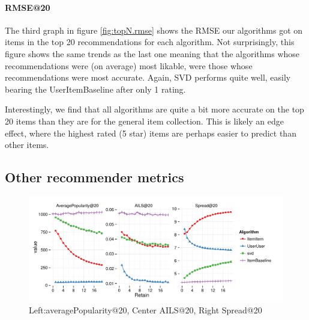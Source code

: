 \documentclass[letterpaper]{sig-alternate}
\begin{document}
  \paragraph{RMSE@20}
  The third graph in figure \ref{fig:topN.rmse} shows the RMSE our algorithms got on items in the top 20 recommendations for each algorithm.
  Not surprisingly, this figure shows the same trends as the last one meaning that the algorithms whose recommendations were (on average) most likable, were those whose recommendations were most accurate.
  Again, SVD performs quite well, easily bearing the UserItemBaseline after only 1 rating.
  
  Interestingly, we find that all algorithms are quite a bit more accurate on the top 20 items than they are for the general item collection.
  This is likely an edge effect, where the highest rated (5 star) items are perhaps easier to predict than other items.

\subsection{Other recommender metrics}

\begin{figure}[ht!]
  \centering
  \includegraphics[width=\linewidth]{../lenskit/output/ekstrandTuned20/popdiv.pdf}
  \caption{Left:averagePopularity@20, Center AILS@20, Right Spread@20}
  \label{fig:pop}
\end{figure}
\end{document}
